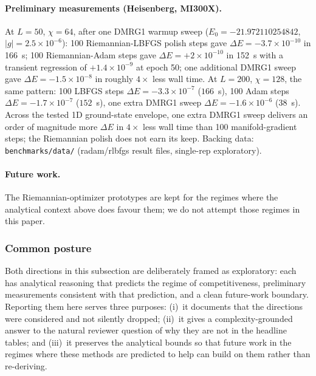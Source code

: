 \documentclass[preprint,12pt]{elsarticle}
\begin{document}
\paragraph{Preliminary measurements (Heisenberg, MI300X).}  At $L{=}50$, $\chi{=}64$, after one DMRG1 warmup sweep ($E_0 = -21.972110254842$, $|g| = 2.5\times 10^{-6}$): 100 Riemannian-LBFGS polish steps gave $\Delta E = -3.7\times 10^{-10}$ in 166~s; 100 Riemannian-Adam steps gave $\Delta E = +2\times 10^{-10}$ in 152~s with a transient regression of $+1.4\times 10^{-9}$ at epoch 50; one additional DMRG1 sweep gave $\Delta E = -1.5\times 10^{-8}$ in roughly $4\times$ less wall time.  At $L{=}200$, $\chi{=}128$, the same pattern: 100 LBFGS steps $\Delta E = -3.3\times 10^{-7}$ ($166$~s), 100 Adam steps $\Delta E = -1.7\times 10^{-7}$ ($152$~s), one extra DMRG1 sweep $\Delta E = -1.6\times 10^{-6}$ ($38$~s).  Across the tested 1D ground-state envelope, one extra DMRG1 sweep delivers an order of magnitude more $\Delta E$ in $4\times$ less wall time than 100 manifold-gradient steps; the Riemannian polish does not earn its keep.  Backing data: \texttt{benchmarks/data/} (radam/rlbfgs result files, single-rep exploratory).

\paragraph{Future work.}  The Riemannian-optimizer prototypes are kept for the regimes where the analytical context above does favour them; we do not attempt those regimes in this paper.

\subsubsection{Common posture}

Both directions in this subsection are deliberately framed as exploratory: each has analytical reasoning that predicts the regime of competitiveness, preliminary measurements consistent with that prediction, and a clean future-work boundary.  Reporting them here serves three purposes: (i)~it documents that the directions were considered and not silently dropped; (ii)~it gives a complexity-grounded answer to the natural reviewer question of why they are not in the headline tables; and (iii)~it preserves the analytical bounds so that future work in the regimes where these methods are predicted to help can build on them rather than re-deriving.


\end{document}
